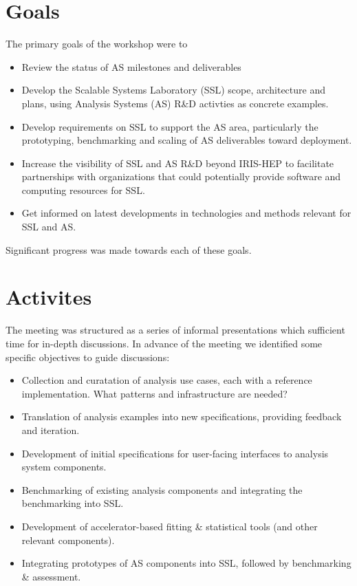 \documentclass[11pt,letterpaper,fleqn]{article}
\begin{document}
\section{Goals}
The primary goals of the workshop were to
\begin{itemize}
  \item Review the status of AS milestones and deliverables
  \item Develop the Scalable Systems Laboratory (SSL) scope, architecture and plans, using Analysis Systems (AS) R\&D activties as concrete examples.
  \item Develop requirements on SSL to support the AS area, particularly the prototyping, benchmarking and scaling of AS deliverables toward deployment.
  \item Increase the visibility of SSL and AS R\&D beyond IRIS-HEP to facilitate partnerships with organizations that could potentially provide software and computing resources for SSL.
  \item Get informed on latest developments in technologies and methods relevant for SSL and AS.
\end{itemize}
Significant progress was made towards each of these goals.


\section{Activites}

The meeting was structured as a series of informal presentations which sufficient time for in-depth discussions.  In advance of the meeting we identified some specific objectives to guide discussions:

\begin{itemize}
  \item Collection and curatation of analysis use cases, each with a reference implementation.  What patterns and infrastructure are needed?
  \item Translation of analysis examples into new specifications, providing feedback and iteration.
  \item Development of initial specifications for user-facing interfaces to analysis system components.
  \item Benchmarking of existing analysis components and integrating the benchmarking into SSL.
  \item Development of accelerator-based fitting \& statistical tools (and other relevant components).
  \item Integrating prototypes of AS components into SSL, followed by benchmarking \& assessment.
\end{itemize}
\end{document}
